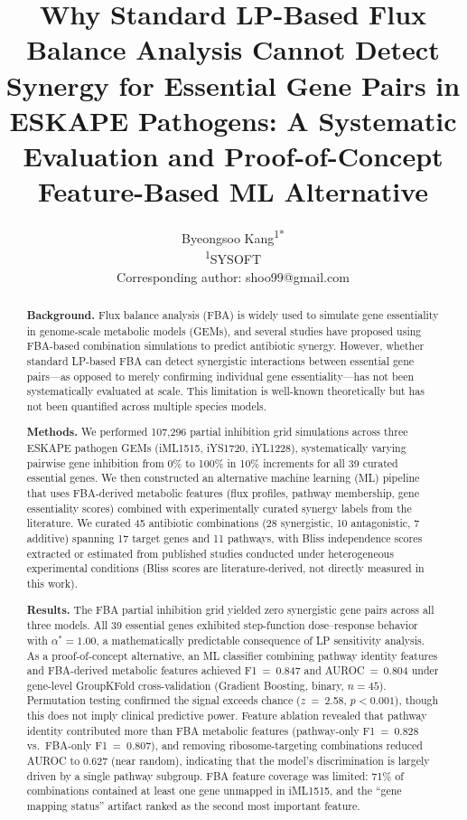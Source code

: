 \documentclass[12pt,a4paper]{article}
\title{Why Standard LP-Based Flux Balance Analysis Cannot Detect Synergy for Essential Gene Pairs in ESKAPE Pathogens: A Systematic Evaluation and Proof-of-Concept Feature-Based ML Alternative}
\author{
Byeongsoo Kang\textsuperscript{1*}\\
\small\textsuperscript{1}SYSOFT\\
\small *Corresponding author: shoo99@gmail.com
}
\date{}
\begin{document}
\maketitle

\begin{abstract}
\textbf{Background.} Flux balance analysis (FBA) is widely used to simulate gene essentiality in genome-scale metabolic models (GEMs), and several studies have proposed using FBA-based combination simulations to predict antibiotic synergy. However, whether standard LP-based FBA can detect synergistic interactions between essential gene pairs---as opposed to merely confirming individual gene essentiality---has not been systematically evaluated at scale. This limitation is well-known theoretically but has not been quantified across multiple species models.

\textbf{Methods.} We performed 107,296 partial inhibition grid simulations across three ESKAPE pathogen GEMs (iML1515, iYS1720, iYL1228), systematically varying pairwise gene inhibition from 0\% to 100\% in 10\% increments for all 39 curated essential genes. We then constructed an alternative machine learning (ML) pipeline that uses FBA-derived metabolic features (flux profiles, pathway membership, gene essentiality scores) combined with experimentally curated synergy labels from the literature. We curated 45 antibiotic combinations (28 synergistic, 10 antagonistic, 7 additive) spanning 17 target genes and 11 pathways, with Bliss independence scores extracted or estimated from published studies conducted under heterogeneous experimental conditions (Bliss scores are literature-derived, not directly measured in this work).

\textbf{Results.} The FBA partial inhibition grid yielded zero synergistic gene pairs across all three models. All 39 essential genes exhibited step-function dose--response behavior with $\alpha^* = 1.00$, a mathematically predictable consequence of LP sensitivity analysis. As a proof-of-concept alternative, an ML classifier combining pathway identity features and FBA-derived metabolic features achieved F1~=~0.847 and AUROC~=~0.804 under gene-level GroupKFold cross-validation (Gradient Boosting, binary, $n = 45$). Permutation testing confirmed the signal exceeds chance ($z$~=~2.58, $p < 0.001$), though this does not imply clinical predictive power. Feature ablation revealed that pathway identity contributed more than FBA metabolic features (pathway-only F1~=~0.828 vs.\ FBA-only F1~=~0.807), and removing ribosome-targeting combinations reduced AUROC to 0.627 (near random), indicating that the model's discrimination is largely driven by a single pathway subgroup. FBA feature coverage was limited: 71\% of combinations contained at least one gene unmapped in iML1515, and the ``gene mapping status'' artifact ranked as the second most important feature.


\end{abstract}
\end{document}
